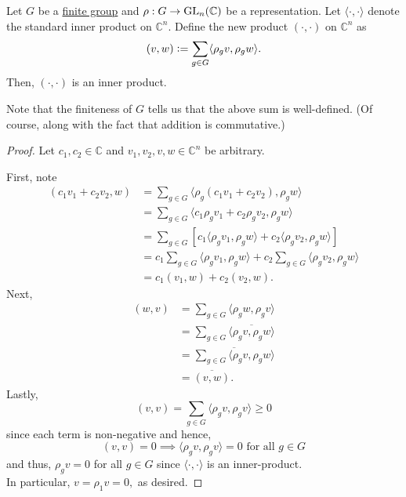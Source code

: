 \begin{lem} \label{lem:newinnerproduct}
	Let $G$ be a \underline{finite group} and $\rho:G \to \operatorname{GL}_n(\mathbb{C})$ be a representation. Let $\langle \cdot, \cdot\rangle$ denote the standard inner product on $\mathbb{C}^n.$ Define the new product $(\cdot, \cdot)$ on $\mathbb{C}^n$ as
	\begin{equation*} 
		(v, w) \vcentcolon= \sum_{g \in G} \langle \rho_gv, \rho_gw\rangle.
	\end{equation*}
	Then, $(\cdot, \cdot)$ is an inner product.
\end{lem}
Note that the finiteness of $G$ tells us that the above sum is well-defined. (Of course, along with the fact that addition is commutative.)
\begin{proof} 
	Let $c_1, c_2 \in \mathbb{C}$ and $v_1, v_2, v, w \in \mathbb{C}^n$ be arbitrary.

	First, note
	\begin{align*} 
		(c_1v_1 + c_2v_2, w) &= \sum_{g \in G} \langle \rho_g(c_1v_1 + c_2v_2), \rho_gw\rangle\\
		&= \sum_{g \in G} \langle c_1\rho_gv_1 + c_2\rho_gv_2, \rho_gw\rangle\\
		&= \sum_{g \in G} \left[c_1\langle \rho_gv_1, \rho_gw\rangle + c_2\langle \rho_gv_2, \rho_gw\rangle\right]\\
		&= c_1\sum_{g \in G} \langle \rho_gv_1, \rho_gw\rangle + c_2\sum_{g \in G} \langle \rho_gv_2, \rho_gw\rangle\\
		&= c_1(v_1, w) + c_2(v_2, w).
	\end{align*}
	Next, 
	\begin{align*} 
		(w, v) &= \sum_{g \in G} \langle \rho_gw, \rho_gv\rangle\\
		&= \sum_{g \in G} \overline{\langle \rho_gv, \rho_gw\rangle}\\
		&= \overline{\sum_{g \in G} \langle \rho_gv, \rho_gw\rangle}\\
		&= \overline{(v, w)}.
	\end{align*}
	Lastly,
	\begin{equation*} 
		(v, v) = \sum_{g \in G} \langle \rho_gv, \rho_gv\rangle \ge 0
	\end{equation*}
	since each term is non-negative and hence,
	\begin{equation*} 
		(v, v) = 0 \implies \langle \rho_gv, \rho_gv\rangle = 0 \text{ for all } g \in G
	\end{equation*}
	and thus, $\rho_gv = 0$ for all $g \in G$ since $\langle \cdot, \cdot\rangle$ is an inner-product.\\
	In particular, $v = \rho_1v = 0,$ as desired.
\end{proof}

